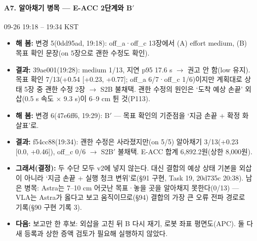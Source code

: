 \paragraph{A7. 알아채기 병목 --- E-ACC 2단계와 B$'$}
{\small 09-26 19:18 -- 19:34 KST}
\begin{itemize}
  \item \textbf{해 봄:} 변경 5(0dd95ad, 19:18): off\_a·off\_c 13장에서 (A) effort medium, (B) 목표 확인 문장(on 5장으로 괜한 수정도 확인).
  \item \textbf{결과:} 39ae001(19:28): medium 1/13, 지연 p95 17.6 s $\rightarrow$ 권고 안 함(low 유지). 목표 확인 7/13(+0.54 [+0.23, +0.77]; off\_a 6/7·off\_c 1/6)이지만 계획대로 상태 5장 중 괜한 수정 2장 $\rightarrow$ S2B 불채택. 괜한 수정의 원인은 `도착 예상 손끝' 외삽(0.5 s 속도 $\times$ 9.3 s)이 6--9 cm 튄 것(P113).
  \item \textbf{해 봄:} 변경 6(47e6ff6, 19:29): B$'$ --- 목표 확인의 기준점을 `지금 손끝 + 확정 화살표'로.
  \item \textbf{결과:} f54cc88(19:34): 괜한 수정은 사라졌지만(on 5/5) 알아채기 3/13(+0.23 [0.0, +0.46]), off\_c 0/6 $\rightarrow$ S2B$'$ 불채택. E-ACC 합계 6,892.2원(상한 8,000원).
  \item \textbf{그래서(결정):} 두 수단 모두 v2에 넣지 않는다. 대신 결합의 예상 상태 기본을 외삽이 아니라 `지금 손끝 + 실행 청크 변위'로(§91 구현, Task 19, 20d735c 20:38). 남은 병목: Astra는 7--10 cm 어긋난 목표·놓을 곳을 알아채지 못한다(0/13) --- VLA는 Astra가 옳다고 보고 움직이므로(§94) 결합의 가장 큰 오류 전파 경로로 기록(§90 구현 기록 3).
  \item \textbf{다음:} 보고만 한 후보: 외삽을 고친 뒤 B 다시 재기, 로봇 좌표 평면도(APC). 둘 다 새 등록과 상한 증액 검토가 필요해 실행하지 않았다.
\end{itemize}

